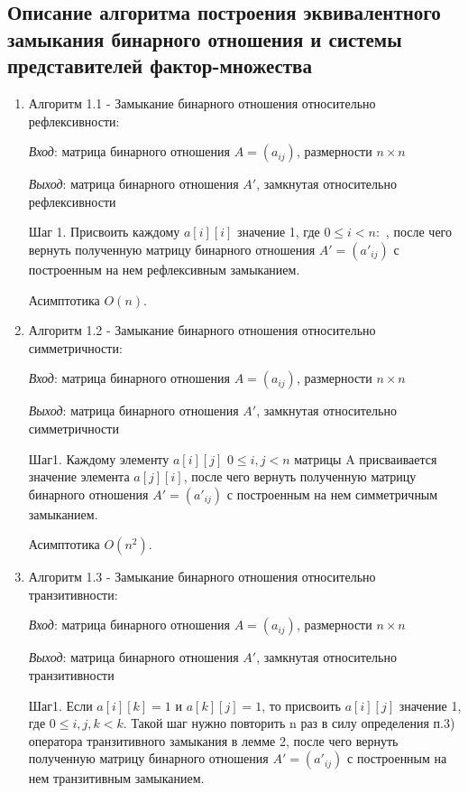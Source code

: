 \documentclass[spec, och, labwork]{shiza}
\begin{document}
\subsection{Описание алгоритма построения эквивалентного замыкания бинарного отношения и системы представителей
фактор-множества}
            \begin{enumerate}

                \item Алгоритм 1.1 - Замыкание бинарного отношения относительно рефлексивности:
                
                \textit{Вход}: матрица бинарного отношения $A = (a_{ij})$, размерности $n \times n$

                \textit{Выход}: матрица бинарного отношения $A'$, замкнутая относительно рефлексивности

                Шаг 1. Присвоить каждому $a[i][i]$ значение 1, где $0 \leq i < n:$ , после чего вернуть полученную матрицу бинарного отношения $A'=(a'_{ij})$ с построенным на нем рефлексивным замыканием.

                Асимптотика $O(n)$.

                \item Алгоритм 1.2 - Замыкание бинарного отношения относительно симметричности:
                
                \textit{Вход}: матрица бинарного отношения $A = (a_{ij})$, размерности $n \times n$

                \textit{Выход}: матрица бинарного отношения $A'$, замкнутая относительно симметричности

                Шаг1. Каждому элементу $a[i][j]$ $0 \leq i, j < n$ матрицы A присваивается значение элемента
                $a[j][i]$, после чего вернуть полученную матрицу бинарного отношения $A'=(a'_{ij})$ с построенным на нем симметричным замыканием.

                Асимптотика $O(n^2)$.

                \item Алгоритм 1.3 - Замыкание бинарного отношения относительно транзитивности:
                
                \textit{Вход}: матрица бинарного отношения $A = (a_{ij})$, размерности $n \times n$

                \textit{Выход}: матрица бинарного отношения $A'$, замкнутая относительно транзитивности

                Шаг1. Если $a[i][k] = 1$ и $a[k][j] = 1$, то присвоить $a[i][j]$ значение 1, где $0 \leq i,j,k < k$. Такой шаг нужно повторить n раз
                в силу определения п.3) оператора транзитивного замыкания в лемме 2, после чего вернуть полученную матрицу бинарного отношения $A'=(a'_{ij})$ с построенным на нем транзитивным замыканием.


\end{enumerate}
\end{document}
